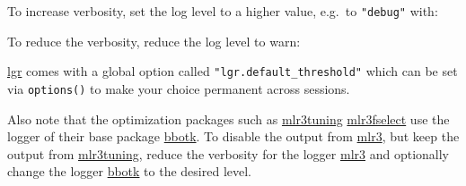 \documentclass[
]{scrbook}
\newenvironment{Shaded}{\begin{snugshade}}{\end{snugshade}}
\newcommand{\FunctionTok}[1]{\textcolor[rgb]{0.00,0.00,0.00}{#1}}
\newcommand{\NormalTok}[1]{#1}
\newcommand{\SpecialCharTok}[1]{\textcolor[rgb]{0.00,0.00,0.00}{#1}}
\newcommand{\StringTok}[1]{\textcolor[rgb]{0.31,0.60,0.02}{#1}}
\renewenvironment{Shaded} {\begin{snugshade}\small} {\end{snugshade}}
\begin{document}
To increase verbosity, set the log level to a higher value, e.g.~to \texttt{"debug"} with:

\begin{Shaded}
\end{Shaded}

To reduce the verbosity, reduce the log level to warn:

\begin{Shaded}
\end{Shaded}

\href{https://cran.r-project.org/package=lgr}{lgr} comes with a global option called \texttt{"lgr.default\_threshold"} which can be set via \texttt{options()} to make your choice permanent across sessions.

Also note that the optimization packages such as \href{https://mlr3tuning.mlr-org.com}{mlr3tuning} \href{https://mlr3fselect.mlr-org.com}{mlr3fselect} use the logger of their base package \href{https://bbotk.mlr-org.com}{bbotk}.
To disable the output from \href{https://mlr3.mlr-org.com}{mlr3}, but keep the output from \href{https://mlr3tuning.mlr-org.com}{mlr3tuning}, reduce the verbosity for the logger \href{https://mlr3.mlr-org.com}{mlr3}
and optionally change the logger \href{https://bbotk.mlr-org.com}{bbotk} to the desired level.

\begin{Shaded}
\end{Shaded}
\end{document}

